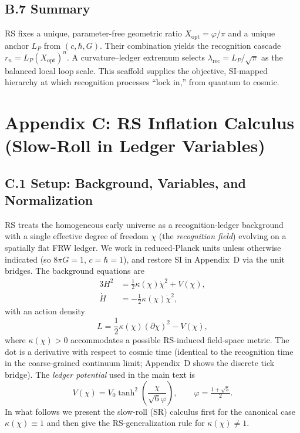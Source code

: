 \documentclass[11pt]{article}
\theoremstyle{definition}
\theoremstyle{remark}
\begin{document}
\subsection*{B.7 Summary}
RS fixes a unique, parameter-free geometric ratio $X_{\mathrm{opt}}=\varphi/\pi$ and a unique anchor $L_P$ from $(c,\hbar,G)$. Their combination yields the recognition cascade $r_n=L_P(X_{\mathrm{opt}})^n$. A curvature–ledger extremum selects $\lambda_{\mathrm{rec}}=L_P/\sqrt{\pi}$ as the balanced local loop scale. This scaffold supplies the objective, SI-mapped hierarchy at which recognition processes “lock in,” from quantum to cosmic.

\section*{Appendix C: RS Inflation Calculus (Slow-Roll in Ledger Variables)}

\subsection*{C.1 Setup: Background, Variables, and Normalization}
RS treats the homogeneous early universe as a recognition-ledger background with a single effective degree of freedom 
$\chi$ (the \emph{recognition field}) evolving on a spatially flat FRW ledger. We work in reduced-Planck units unless otherwise indicated (so 
$8\pi G=1$, $c=\hbar=1$), and restore SI in Appendix~D via the unit bridges. The background equations are
\begin{align}
3H^2 &= \tfrac{1}{2}\kappa(\chi)\dot{\chi}^2 + V(\chi), \label{eq:Friedmann1}\\
\dot{H} &= -\tfrac{1}{2}\kappa(\chi)\dot{\chi}^2, \label{eq:Friedmann2}
\end{align}
with an action density
\begin{equation}
L=\frac{1}{2}\kappa(\chi)(\partial\chi)^2-V(\chi),
\end{equation}
where $\kappa(\chi)>0$ accommodates a possible RS-induced field-space metric. The dot is a derivative with respect to cosmic time (identical to the recognition time in the coarse-grained continuum limit; Appendix~D shows the discrete tick bridge). The \emph{ledger potential} used in the main text is
\begin{equation}
V(\chi)=V_0\tanh^2\!\left(\frac{\chi}{\sqrt{6}\varphi}\right), \qquad \varphi=\tfrac{1+\sqrt{5}}{2}.
\label{eq:V-tanh2}
\end{equation}
In what follows we present the slow-roll (SR) calculus first for the canonical case 
$\kappa(\chi)\equiv 1$ and then give the RS-generalization rule for 
$\kappa(\chi)\neq 1$.
\end{document}
